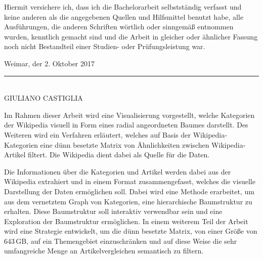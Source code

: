 

Hiermit versichere ich, dass ich die Bachelorarbeit selbstständig verfasst und keine anderen als die angegebenen Quellen und Hilfsmittel benutzt habe, alle Ausführungen, die anderen Schriften wörtlich oder sinngemäß entnommen wurden, kenntlich gemacht sind und die Arbeit in gleicher oder ähnlicher Fassung noch nicht Bestandteil einer Studien- oder Prüfungsleistung war.

\vspace{3cm}
Weimar, der 2. Oktober 2017

\vspace{1cm}
\noindent\rule{5cm}{0.4pt}\\
GIULIANO CASTIGLIA

\clearpage



Im Rahmen dieser Arbeit wird eine Visualisierung vorgestellt, welche Kategorien der Wikipedia visuell in Form eines radial angeordneten Baumes darstellt.
Des Weiteren wird ein Verfahren erläutert, welches auf Basis der Wikipedia-Kategorien eine dünn besetzte Matrix von Ähnlichkeiten zwischen Wikipedia-Artikel filtert.
Die Wikipedia dient dabei als Quelle für die Daten.

Die Informationen über die Kategorien und Artikel werden dabei aus der Wikipedia extrahiert und in einem Format zusammengefasst, welches die visuelle Darstellung der Daten ermöglichen soll.
Dabei wird eine Methode erarbeitet, um aus dem vernetztem Graph von Kategorien, eine hierarchische Baumstruktur zu erhalten.
Diese Baumstruktur soll interaktiv verwendbar sein und eine Exploration der Baumstruktur ermöglichen.
In einem weiterem Teil der Arbeit wird eine Strategie entwickelt, um die dünn besetzte Matrix, von einer Größe von 643\,GB, auf ein Themengebiet einzuschränken und auf diese Weise die sehr umfangreiche Menge an Artikelvergleichen semantisch zu filtern.


